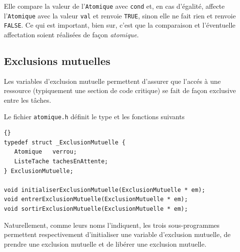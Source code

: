    Elle compare la valeur de l'\lstinline!Atomique! avec
\lstinline!cond! et, en cas d'égalité, affecte l'\lstinline!Atomique!
avec la valeur \lstinline!val! et renvoie \lstinline!TRUE!, sinon elle 
ne fait rien et renvoie \lstinline!FALSE!. Ce qui est important, bien
sur, c'est que la comparaison et l'éventuelle affectation soient
réalisées de façon {\em atomique}.

\subsection{Exclusions mutuelles}

   Les variables d'exclusion mutuelle permettent d'assurer que l'accés
à une ressource (typiquement une section de code critique) se fait de
façon exclusive entre les tâches.

   Le fichier {\tt atomique.h} définit le type et les fonctions
suivants 

\begin{lstlisting}{}
typedef struct _ExclusionMutuelle {
   Atomique   verrou;
   ListeTache tachesEnAttente;
} ExclusionMutuelle;

void initialiserExclusionMutuelle(ExclusionMutuelle * em);
void entrerExclusionMutuelle(ExclusionMutuelle * em);
void sortirExclusionMutuelle(ExclusionMutuelle * em);
\end{lstlisting}

   Naturellement, comme leurs noms l'indiquent, les trois
sous-programmes permettent respectivement d'initialiser une variable
d'exclusion mutuelle, de prendre une exclusion mutuelle et de libérer
une exclusion mutuelle.

